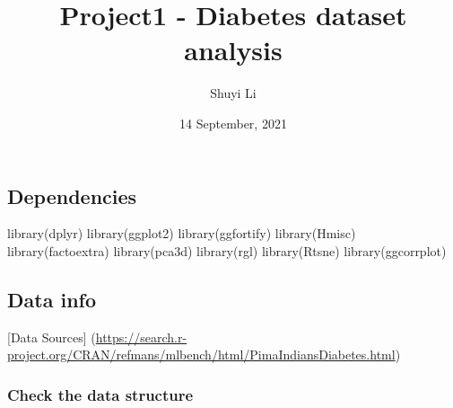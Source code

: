 \documentclass[
]{article}
\title{Project1 - Diabetes dataset analysis}
\author{Shuyi Li}
\date{14 September, 2021}
\newenvironment{Shaded}{\begin{snugshade}}{\end{snugshade}}
\newcommand{\FunctionTok}[1]{\textcolor[rgb]{0.00,0.00,0.00}{#1}}
\newcommand{\NormalTok}[1]{#1}
\begin{document}
\maketitle

{
\setcounter{tocdepth}{2}
\tableofcontents
}
\hypertarget{dependencies}{%
\subsection{Dependencies}\label{dependencies}}

\begin{Shaded}
\begin{Highlighting}[]
\FunctionTok{library}\NormalTok{(dplyr)}
\FunctionTok{library}\NormalTok{(ggplot2)}
\FunctionTok{library}\NormalTok{(ggfortify)}
\FunctionTok{library}\NormalTok{(Hmisc)}
\FunctionTok{library}\NormalTok{(factoextra)}
\FunctionTok{library}\NormalTok{(pca3d)}
\FunctionTok{library}\NormalTok{(rgl)}
\FunctionTok{library}\NormalTok{(Rtsne)}
\FunctionTok{library}\NormalTok{(ggcorrplot)}
\end{Highlighting}
\end{Shaded}

\hypertarget{data-info}{%
\subsection{Data info}\label{data-info}}

{[}Data Sources{]}
(\url{https://search.r-project.org/CRAN/refmans/mlbench/html/PimaIndiansDiabetes.html})

\hypertarget{check-the-data-structure}{%
\subsubsection{Check the data
structure}\label{check-the-data-structure}}
\end{document}
